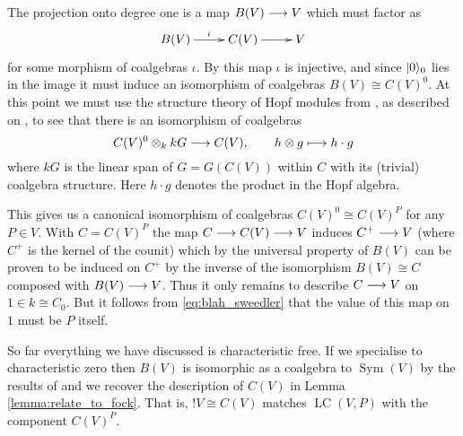 \documentclass[english,letter paper,12pt,reqno]{article}
\DeclarePairedDelimiter\ket{\lvert}{\rangle}
\theoremstyle{example}
\numberwithin{equation}{section}
\DeclareMathOperator{\Sym}{Sym}
\DeclareMathOperator{\LC}{LC}
\begin{document}
The projection onto degree one is a map $B(V) \longrightarrow V$ which must factor as
\[
\xymatrix{
B(V) \ar[r]^-{\iota} & C(V) \ar[r] & V
}
\]
for some morphism of coalgebras $\iota$. By \cite[Theorem 12.2.6]{sweedler} this map $\iota$ is injective, and since $\ket{0}_0$ lies in the image it must induce an isomorphism of coalgebras $B(V) \cong C(V)^0$. At this point we must use the structure theory of Hopf modules from \cite[Chapter 4]{sweedler}, as described on \cite[p.175]{sweedler}, to see that there is an isomorphism of coalgebras
\[
C(V)^0 \otimes_k kG \longrightarrow C(V), \qquad h \otimes g \longmapsto h \cdot g
\]
where $kG$ is the linear span of $G = G(C(V))$ within $C$ with its (trivial) coalgebra structure. Here $h \cdot g$ denotes the product in the Hopf algebra. 

This gives us a canonical isomorphism of coalgebras $C(V)^0 \cong C(V)^P$ for any $P \in V$. With $C = C(V)^P$ the map $C \longrightarrow C(V) \longrightarrow V$ induces $C^+ \longrightarrow V$ (where $C^+$ is the kernel of the counit) which by the universal property of $B(V)$ \cite[Theorem 12.2.5]{sweedler} can be proven to be induced on $C^+$ by the inverse of the isomorphism $B(V) \cong C$ composed with $B(V) \longrightarrow V$. Thus it only remains to describe $C \longrightarrow V$ on $1 \in k \cong C_0$. But it follows from \eqref{eq:blah_sweedler} that the value of this map on $1$ must be $P$ itself.

So far everything we have discussed is characteristic free. If we specialise to characteristic zero then $B(V)$ is isomorphic as a coalgebra to $\Sym(V)$ by the results of \cite[Chapter 12]{sweedler} and we recover the description of $C(V)$ in Lemma \ref{lemma:relate_to_fock}. That is, ${!} V \cong C(V)$ matches $\LC(V,P)$ with the component $C(V)^P$. %
\end{document}
